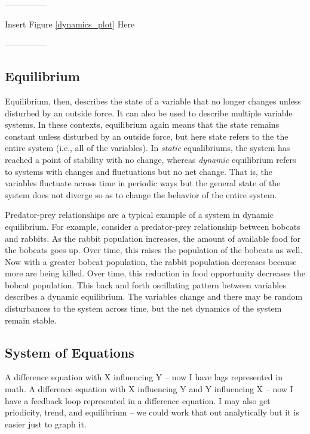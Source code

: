 \documentclass[english,,man]{apa6}
\theoremstyle{definition}
\theoremstyle{definition}
\theoremstyle{definition}
\theoremstyle{remark}
\begin{document}
\begin{center}

---------------

Insert Figure \ref{dynamics_plot} Here

---------------

\end{center}

\hypertarget{equilibrium}{%
\subsection{Equilibrium}\label{equilibrium}}

Equilibrium, then, describes the state of a variable that no longer
changes unless disturbed by an outside force. It can also be used to
describe multiple variable systems. In these contexts, equilibrium again
means that the state remains constant unless disturbed by an outside
force, but here state refers to the the entire system (i.e., all of the
variables). In \emph{static} equalibriums, the system has reached a
point of stability with no change, whereas \emph{dynamic} equilibrium
refers to systems with changes and fluctuations but no net change. That
is, the variables fluctuate across time in periodic ways but the general
state of the system does not diverge so as to change the behavior of the
entire system.

Predator-prey relationships are a typical example of a system in dynamic
equilibrium. For example, consider a predator-prey relationship between
bobcats and rabbits. As the rabbit population increases, the amount of
available food for the bobcats goes up. Over time, this raises the
population of the bobcats as well. Now with a greater bobcat population,
the rabbit population decreases because more are being killed. Over
time, this reduction in food opportunity decreases the bobcat
population. This back and forth oscillating pattern between variables
describes a dynamic equilibrium. The variables change and there may be
random disturbances to the system across time, but the net dynamics of
the system remain stable.

\hypertarget{system-of-equations}{%
\subsection{System of Equations}\label{system-of-equations}}

A difference equation with X influencing Y -- now I have lags
represented in math. A difference equation with X influencing Y and Y
influencing X -- now I have a feedback loop represented in a difference
equation. I may also get priodicity, trend, and equilibrium -- we could
work that out analytically but it is easier just to graph it.
\end{document}
